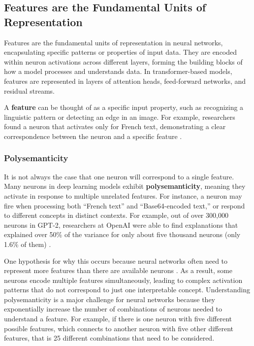 \documentclass[sigconf,authoryear]{acmart}
\begin{document}
\subsection{Features are the Fundamental Units of Representation}
Features are the fundamental units of representation in neural networks, encapsulating specific patterns or properties of input data. They are encoded within neuron activations across different layers, forming the building blocks of how a model processes and understands data. In transformer-based models, features are represented in layers of attention heads, feed-forward networks, and residual streams.

A \textbf{feature} can be thought of as a specific input property, such as recognizing a linguistic pattern or detecting an edge in an image. For example, researchers found a neuron that activates only for French text, demonstrating a clear correspondence between the neuron and a specific feature \citep{gurnee2023findingneuronshaystackcase}.

\subsubsection{Polysemanticity}

It is not always the case that one neuron will correspond to a single feature. Many neurons in deep learning models exhibit \textbf{polysemanticity}, meaning they activate in response to multiple unrelated features. For instance, a neuron may fire when processing both ``French text'' and ``Base64-encoded text,'' or respond to different concepts in distinct contexts. For example, out of over 300,000 neurons in GPT-2, researchers at OpenAI were able to find explanations that explained over 50\% of the variance for only about five thousand neurons (only 1.6\% of them) \citep{LawrenceC2024,bills2023language}.   


One hypothesis for why this occurs because neural networks often need to represent more features than there are available neurons \citep{elhage2022superposition}. As a result, some neurons encode multiple features simultaneously, leading to complex activation patterns that do not correspond to just one interpretable concept. Understanding polysemanticity is a major challenge for neural networks because they exponentially increase the number of combinations of neurons needed to understand a feature. For example, if there is one neuron with five different possible features, which connects to another neuron with five other different features, that is 25 different combinations that need to be considered. \citep{olah2020zoom}  
\end{document}
